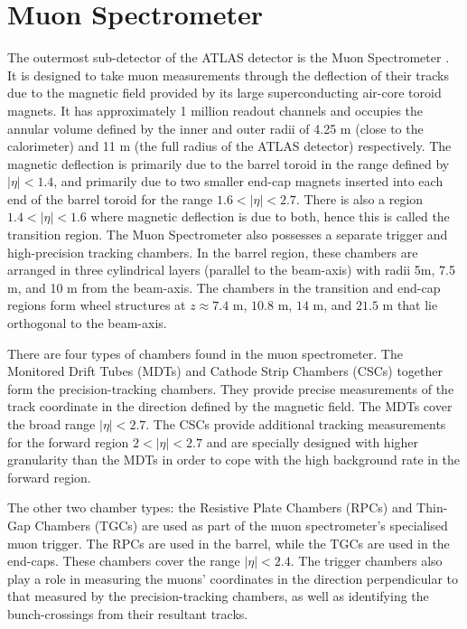 \section{Muon Spectrometer}
The outermost sub-detector of the ATLAS detector is the Muon Spectrometer \cite{ATLAS}. It is designed to take muon measurements through the deflection of their tracks due to the magnetic field provided by its large superconducting air-core toroid magnets. It has approximately 1 million readout channels and occupies the annular volume defined by the inner and outer radii of 4.25 m (close to the calorimeter) and 11 m (the full radius of the ATLAS detector) respectively. The magnetic deflection is primarily due to the barrel toroid in the range defined by $ | \eta | < 1.4$, and primarily due to two smaller end-cap magnets inserted into each end of the barrel toroid for the range $1.6 < | \eta | < 2.7$. There is also a region $1.4 < | \eta | < 1.6$ where magnetic deflection is due to both, hence this is called the transition region. The Muon Spectrometer also possesses a separate trigger and high-precision tracking chambers. In the barrel region, these chambers are arranged in three cylindrical layers (parallel to the beam-axis) with radii 5m, 7.5 m, and 10 m from the beam-axis. The chambers in the transition and end-cap regions form wheel structures at $z \approx 7.4$ m, $10.8$ m, $14$ m, and $21.5$ m that lie orthogonal to the beam-axis.

There are four types of chambers found in the muon spectrometer. The Monitored Drift Tubes (MDTs) and Cathode Strip Chambers (CSCs) together form the precision-tracking chambers. They provide precise measurements of the track coordinate in the direction defined by the magnetic field. The MDTs cover the broad range $|\eta | < 2.7$. The CSCs provide additional tracking measurements for the forward region $2 < | \eta | < 2.7$ and are specially designed with higher granularity than the MDTs in order to cope with the high background rate in the forward region.

The other two chamber types: the Resistive Plate Chambers (RPCs) and Thin-Gap Chambers (TGCs) are used as part of the muon spectrometer's specialised muon trigger. The RPCs are used in the barrel, while the TGCs are used in the end-caps. These chambers cover the range $ | \eta | < 2.4$. The trigger chambers also play a role in measuring the muons' coordinates in the direction perpendicular to that measured by the precision-tracking chambers, as well as identifying the bunch-crossings from their resultant tracks.

